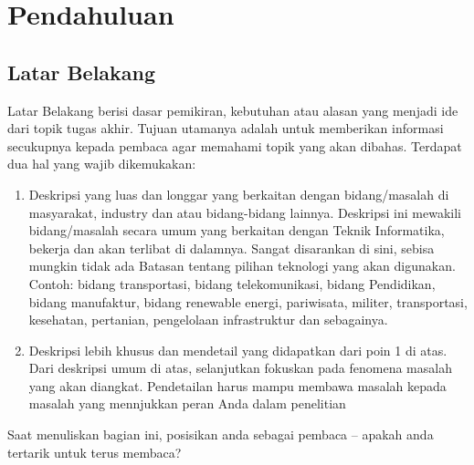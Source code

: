 \newpage
\chapter{Pendahuluan} \label{I:Pendahuluan}

\section{Latar Belakang} \label{I.Latar Belakang}
Latar Belakang berisi dasar pemikiran, kebutuhan atau alasan yang menjadi ide dari topik tugas akhir. Tujuan utamanya adalah untuk memberikan informasi secukupnya kepada pembaca agar memahami topik yang akan dibahas. Terdapat dua hal yang wajib dikemukakan: \par 
\begin{enumerate}
	\item Deskripsi yang luas dan longgar yang berkaitan dengan bidang/masalah di masyarakat, industry dan atau bidang-bidang lainnya. Deskripsi ini mewakili bidang/masalah secara umum yang berkaitan dengan Teknik Informatika, bekerja dan akan terlibat di dalamnya. Sangat disarankan di sini, sebisa mungkin tidak ada Batasan tentang pilihan teknologi yang akan digunakan. Contoh: bidang transportasi, bidang telekomunikasi, bidang Pendidikan, bidang manufaktur, bidang renewable energi, pariwisata, militer, transportasi, kesehatan, pertanian, pengelolaan infrastruktur dan sebagainya.
	\item Deskripsi lebih khusus dan mendetail yang didapatkan dari poin 1 di atas. Dari deskripsi umum di atas, selanjutkan fokuskan pada fenomena masalah yang akan diangkat. Pendetailan harus mampu membawa masalah kepada masalah yang mennjukkan peran Anda dalam penelitian 
\end{enumerate} \par
Saat menuliskan bagian ini, posisikan anda sebagai pembaca – apakah anda tertarik untuk terus membaca?

